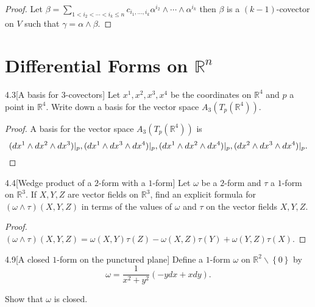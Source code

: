 \begin{proof}
    Let \( \beta = \sum_{1 < i_{2} < \cdots < i_{k} \leq n} c_{i_{1},\ldots,i_{k}} \alpha^{i_{2}} \wedge \cdots \wedge \alpha^{i_{k}} \) then \( \beta \) is a \( (k-1) \)-covector on \( V \) such that \( \gamma = \alpha \wedge \beta \).
\end{proof}

\section{Differential Forms on \( \mathbb{R}^{n} \)}

\begin{exercise}{4.3}[A basis for \(3\)-covectors]
    Let \(x^{1}, x^{2}, x^{3}, x^{4}\) be the coordinates on \(\mathbb{R}^{4}\) and \(p\) a point in \(\mathbb{R}^{4}\). Write down a basis for the vector space \(A_{3}(T_{p}(\mathbb{R}^{4}))\).
\end{exercise}

\begin{proof}
    A basis for the vector space \(A_{3}(T_{p}(\mathbb{R}^{4}))\) is
    \[
        (dx^{1} \wedge dx^{2} \wedge dx^{3})\vert_{p}, (dx^{1} \wedge dx^{3} \wedge dx^{4})\vert_{p}, (dx^{1} \wedge dx^{2} \wedge dx^{4})\vert_{p}, (dx^{2} \wedge dx^{3} \wedge dx^{4})\vert_{p}. \qedhere
    \]
\end{proof}

\begin{exercise}{4.4}[Wedge product of a \(2\)-form with a \(1\)-form]
    Let \(\omega\) be a \(2\)-form and \(\tau\) a \(1\)-form on \(\mathbb{R}^{3}\). If \(X, Y, Z\) are vector fields on \(\mathbb{R}^{3}\), find an explicit formula for \((\omega \wedge \tau)(X, Y, Z)\) in terms of the values of \(\omega\) and \(\tau\) on the vector fields \(X, Y, Z\).
\end{exercise}

\begin{proof}
    \( (\omega \wedge \tau)(X, Y, Z) = \omega(X, Y)\tau(Z) - \omega(X, Z)\tau(Y) + \omega(Y, Z)\tau(X) \).
\end{proof}

\begin{exercise}{4.9}[A closed \(1\)-form on the punctured plane]
    Define a \(1\)-form \(\omega\) on \( \mathbb{R}^{2}\smallsetminus \left\{0\right\} \) by
    \[
        \omega = \frac{1}{x^{2} + y^{2}}(-ydx + xdy).
    \]

    Show that \(\omega\) is closed.
\end{exercise}

